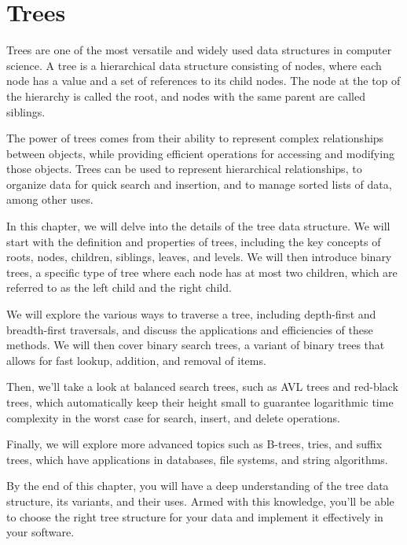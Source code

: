 \chapter{Trees}

Trees are one of the most versatile and widely used data structures in computer science. A tree is a hierarchical data structure consisting of nodes, where each node has a value and a set of references to its child nodes. The node at the top of the hierarchy is called the root, and nodes with the same parent are called siblings.

The power of trees comes from their ability to represent complex relationships between objects, while providing efficient operations for accessing and modifying those objects. Trees can be used to represent hierarchical relationships, to organize data for quick search and insertion, and to manage sorted lists of data, among other uses.

In this chapter, we will delve into the details of the tree data structure. We will start with the definition and properties of trees, including the key concepts of roots, nodes, children, siblings, leaves, and levels. We will then introduce binary trees, a specific type of tree where each node has at most two children, which are referred to as the left child and the right child.

We will explore the various ways to traverse a tree, including depth-first and breadth-first traversals, and discuss the applications and efficiencies of these methods. We will then cover binary search trees, a variant of binary trees that allows for fast lookup, addition, and removal of items.

Then, we'll take a look at balanced search trees, such as AVL trees and red-black trees, which automatically keep their height small to guarantee logarithmic time complexity in the worst case for search, insert, and delete operations.

Finally, we will explore more advanced topics such as B-trees, tries, and suffix trees, which have applications in databases, file systems, and string algorithms.

By the end of this chapter, you will have a deep understanding of the tree data structure, its variants, and their uses. Armed with this knowledge, you'll be able to choose the right tree structure for your data and implement it effectively in your software.

